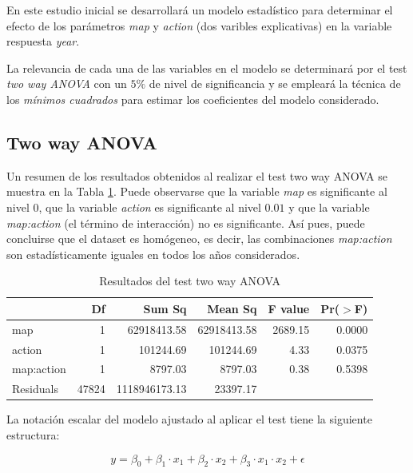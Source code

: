 En este estudio inicial se desarrollará un modelo estadístico para determinar el efecto de los parámetros \emph{map} y \emph{action} (dos varibles explicativas) en la variable respuesta \emph{year}.

La relevancia de cada una de las variables en el modelo se determinará por el test \emph{two way ANOVA} con un $5\%$ de nivel de significancia y se empleará la técnica de los \emph{mínimos cuadrados} para estimar los coeficientes del modelo considerado.

\subsection{Two way ANOVA}

Un resumen de los resultados obtenidos al realizar el test two way ANOVA se muestra en la Tabla \ref{table:3}. Puede observarse que la variable \emph{map} es significante al nivel $0$, que la variable \emph{action} es significante al nivel $0.01$ y que la variable \emph{map:action} (el término de interacción) no es significante. Así pues, puede concluirse que el dataset es homógeneo, es decir, las combinaciones \emph{map:action} son estadísticamente iguales en todos los años considerados.

\begin{table}[ht]
\centering
\begin{tabular}{lrrrrr}
  \hline
 & Df & Sum Sq & Mean Sq & F value & Pr($>$F) \\ 
  \hline
map         & 1 & 62918413.58 & 62918413.58 & 2689.15 & 0.0000 \\ 
  action      & 1 & 101244.69 & 101244.69 & 4.33 & 0.0375 \\ 
  map:action  & 1 & 8797.03 & 8797.03 & 0.38 & 0.5398 \\ 
  Residuals   & 47824 & 1118946173.13 & 23397.17 &  &  \\ 
   \hline
\end{tabular}
\caption{Resultados del test two way ANOVA}
\label{table:3}
\end{table}

La notación escalar del modelo ajustado al aplicar el test tiene la siguiente estructura:

\begin{equation}
    y = \beta_0 + \beta_1 \cdot x_1 + \beta_2 \cdot x_2 + \beta_3 \cdot x_1 \cdot x_2 + \epsilon
\label{eq1}
\end{equation}


